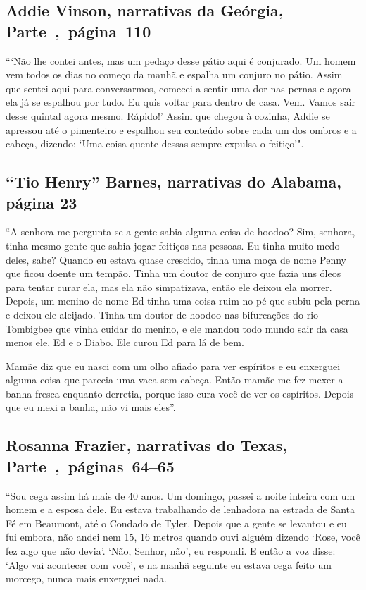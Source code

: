 \subsection{Addie Vinson, narrativas da Geórgia, Parte~,~página~110}
\label{ref271}

```Não lhe contei antes, mas um pedaço desse pátio aqui é conjurado. Um
homem vem todos os dias no começo da manhã e espalha um conjuro no
pátio. Assim que sentei aqui para conversarmos, comecei a sentir uma dor
nas pernas e agora ela já se espalhou por tudo. Eu quis voltar para
dentro de casa. Vem. Vamos sair desse quintal agora mesmo. Rápido!'
Assim que chegou à cozinha, Addie se apressou até o pimenteiro e
espalhou seu conteúdo sobre cada um dos ombros e a cabeça, dizendo: `Uma
coisa quente dessas sempre expulsa o feitiço'".

\subsection{``Tio Henry'' Barnes, narrativas do Alabama, página 23} \label{ref16}

``A senhora me pergunta se a gente sabia alguma coisa de hoodoo? Sim,
senhora, tinha mesmo gente que sabia jogar feitiços nas pessoas. Eu
tinha muito medo deles, sabe? Quando eu estava quase crescido, tinha uma moça
de nome Penny que ficou doente um tempão. Tinha um doutor de conjuro que
fazia uns óleos para tentar curar ela, mas ela não simpatizava, então
ele deixou ela morrer. Depois, um menino de nome Ed tinha uma coisa ruim
no pé que subiu pela perna e deixou ele aleijado. Tinha um doutor de
hoodoo nas bifurcações do rio Tombigbee que vinha cuidar do menino, e
ele mandou todo mundo sair da casa menos ele, Ed e o Diabo. Ele curou Ed
para lá de bem.

Mamãe diz que eu nasci com um olho afiado para ver espíritos e eu
enxerguei alguma coisa que parecia uma vaca sem cabeça. Então mamãe me
fez mexer a banha fresca enquanto derretia, porque isso cura você de ver
os espíritos. Depois que eu mexi a banha, não vi mais eles''.

\subsection{Rosanna Frazier, narrativas do Texas, Parte~,~páginas~64--65} \label{ref93}

``Sou cega assim há mais de 40 anos. Um domingo, passei a noite inteira
com um homem e a esposa dele. Eu estava trabalhando de lenhadora na
estrada de Santa Fé em Beaumont, até o Condado de Tyler. Depois que a
gente se levantou e eu fui embora, não andei nem 15, 16 metros quando
ouvi alguém dizendo `Rose, você fez algo que não devia'. `Não, Senhor,
não', eu respondi. E então a voz disse: `Algo vai acontecer com você', e
na manhã seguinte eu estava cega feito um morcego, nunca mais enxerguei
nada.

